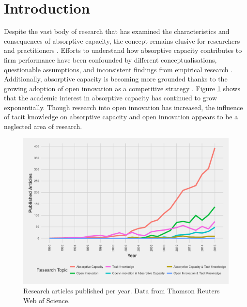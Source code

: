 


\section{Introduction}

Despite the vast body of research that has examined the characteristics and consequences of absorptive capacity, the concept remains elusive for researchers and practitioners \citep{duchek2013capturing,omidvar2013revisiting}. Efforts to understand how absorptive capacity contributes to firm performance have been confounded by different conceptualisations, questionable assumptions, and inconsistent findings from empirical research \citep{lane2006reification,lichtenthaler2016absorptive}. Additionally, absorptive capacity is becoming more grounded thanks to the growing adoption of open innovation as a competitive strategy \citep{volberda2010perspective,ahn2016beyond,xia2016unpacking}. Figure \ref{fig:bibliometric} shows that the academic interest in absorptive capacity has continued to grow exponentially. Though research into open innovation has increased, the influence of tacit knowledge on absorptive capacity and open innovation appears to be a neglected area of research.\medskip 

\begin{figure}
	\small
	\centering
	\includegraphics[width=1.0\linewidth]{Images/bibliometric}
	\caption{Research articles published per year. Data from Thomson Reuters Web of Science\texttrademark.}
	\label{fig:bibliometric}
\end{figure}

